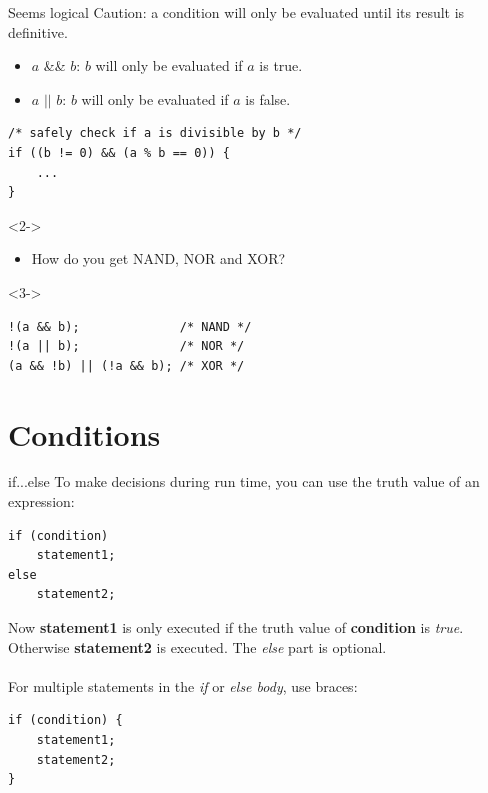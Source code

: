 \begin{frame}[fragile]{Seems logical}
	Caution: a condition will only be evaluated until its result is definitive.
	\begin{itemize}
	\item $a$ \&\& $b$: $b$ will only be evaluated if $a$ is true.
	\item $a$ $||$ $b$: $b$ will only be evaluated if $a$ is false.
	\end{itemize}
	\begin{lstlisting}[numbers=none]
/* safely check if a is divisible by b */
if ((b != 0) && (a % b == 0)) {
    ...
}
\end{lstlisting} 
	\bigskip
	\begin{uncoverenv}<2->
		\begin{itemize}
			\item How do you get NAND, NOR and XOR?
		\end{itemize}
	\end{uncoverenv}
	\begin{uncoverenv}<3->
		\begin{lstlisting}[numbers=none]
!(a && b);              /* NAND */
!(a || b);              /* NOR */
(a && !b) || (!a && b); /* XOR */
\end{lstlisting}
	\end{uncoverenv}
\end{frame}

\section{Conditions}

\begin{frame}[fragile]{if...else}
	To make decisions during run time, you can use the truth value of an expression:
	\begin{lstlisting}[numbers=none,basicstyle=\itshape\footnotesize]
if (condition)
    statement1;
else
    statement2;
\end{lstlisting}
	Now \textbf{statement1} is only executed if the truth value of \textbf{condition} is \textit{true}. Otherwise \textbf{statement2} is executed. The \textit{else} part is optional.\\\ \\
	For multiple statements in the \textit{if} or \textit{else body}, use braces:
	\begin{lstlisting}[numbers=none,basicstyle=\itshape\footnotesize]
if (condition) {
    statement1;
    statement2;
}
\end{lstlisting}
\end{frame}

